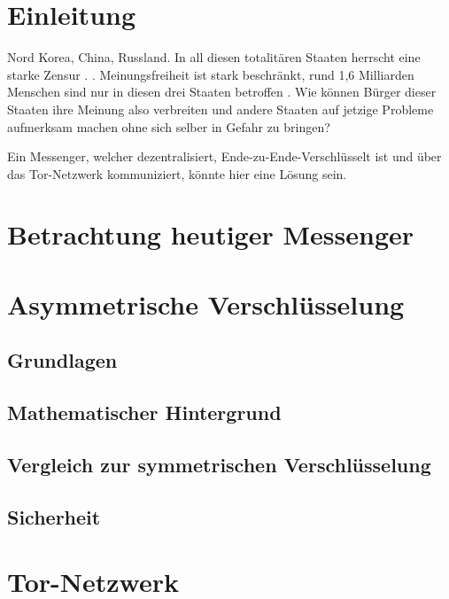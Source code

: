 \documentclass[a4paper,ngerman, headheight=28pt,12pt]{scrartcl}
\newcommand{\vcite}[1]{\cite[vgl.][]{#1}}
\begin{document}

\tableofcontents
\setcounter{page}{0}
\thispagestyle{empty}
\vspace{0.5cm}
\pagebreak


\linenumbers
\modulolinenumbers[5]

\section{Einleitung}
Nord Korea, China, Russland. In all diesen totalitären Staaten herrscht eine starke Zensur \vcite{AmnReport}. \cite{UnPop}. %
Meinungsfreiheit ist stark beschränkt, rund 1,6 Milliarden Menschen sind nur in diesen drei Staaten betroffen \vcite{UnPop}. Wie können Bürger dieser Staaten ihre Meinung also verbreiten und andere Staaten auf jetzige Probleme aufmerksam machen ohne sich selber in Gefahr zu bringen?

Ein Messenger, welcher dezentralisiert, Ende-zu-Ende-Verschlüsselt ist und über das Tor-Netzwerk kommuniziert, könnte hier eine Lösung sein.

\section{Betrachtung heutiger Messenger}

\section{Asymmetrische Verschlüsselung}
\subsection{Grundlagen}
\subsection{Mathematischer Hintergrund}
\subsection{Vergleich zur symmetrischen Verschlüsselung}
\subsection{Sicherheit}

\section{Tor-Netzwerk}
\end{document}
